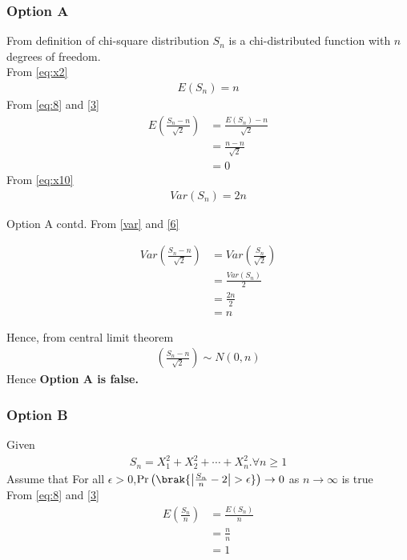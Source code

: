 \documentclass{beamer}
\providecommand{\pr}[1]{\ensuremath{\Pr\left(#1\right)}}
\begin{document}
\begin{frame}
\frametitle{Option A}
From definition of chi-square distribution $S_n$ is a chi-distributed function with $n$ degrees of freedom.\\
From \eqref{eq:x2} 
\begin{align}
    E(S_n)=n \label{eq:8}
\end{align}
From \eqref{eq:8} and \eqref{3}
\begin{align}
    E\left(\frac{S_{n}-n}{\sqrt{2}}\right)&=\frac{E(S_n)-n}{\sqrt{2}}\\
     &=\frac{n-n}{\sqrt{2}}\\
    &=0
\end{align}
From \eqref{eq:x10}
\begin{align}
    Var(S_n)= 2n\label{var}
\end{align}
\end{frame}
\begin{frame}{Option A contd.}
From \eqref{var} and \eqref{6}

\begin{align}
    Var\left(\frac{S_{n}-n}{\sqrt{2}}\right)
    &= Var\left(\frac{S_n}{\sqrt{2}}\right)\\
    &=\frac{Var(S_n)}{2}\\
    &=\frac{2n}{2}\\
    &=n
\end{align}

Hence, from central limit theorem
\begin{align}
    \left(\frac{S_{n}-n}{\sqrt{2}}\right)\sim N(0,n)
\end{align}
Hence \textbf{Option A is false.}
\end{frame}



\begin{frame}
\frametitle{Option B}
Given 
\begin{align}
    S_{n}=X_{1}^2+X_{2}^2+\cdots+X_{n}^2.\forall n\geq 1
\end{align}
Assume that For all $\epsilon > 0$,$\pr{\brak{\left|{\frac{S_n}{n}-2}\right|>\epsilon}}\to 0$ as $n \to \infty$ is true\\
From \eqref{eq:8} and \eqref{3}
\begin{align}
    E\left(\frac{S_n}{n}\right)&=\frac{E(S_n)}{n}\\
        &=\frac{n}{n}\\
        &=1\label{25}
\end{align}
\end{frame}
\end{document}
